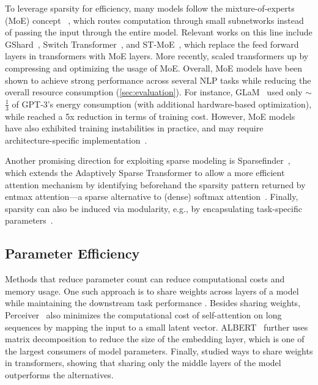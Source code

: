 To leverage sparsity for efficiency, many models follow the mixture-of-experts (MoE) concept~ \citep{jacobs1991adaptive,shazeer2017outrageously,fedus2022review}, which routes computation through small subnetworks instead of passing the input through the entire model. Relevant works on this line include GShard~\citep{Lepikhin2021GShardSG}, Switch Transformer~\citep{fedus2021switch}, and ST-MoE~\citep{zoph2022designing}, which replace the feed forward layers in transformers with MoE layers. More recently, \citet{Rajbhandari2022} scaled transformers up by compressing and optimizing the usage of MoE. Overall, MoE models have been shown to achieve strong performance across several NLP tasks while reducing the overall resource consumption (\ref{sec:evaluation}). 
For instance, GLaM~\citep{pmlr-v162-du22c} used only $\sim$$\frac{1}{3}$ of GPT-3's energy consumption (with additional hardware-based optimization), while \citet{Rajbhandari2022} reached a 5x reduction in terms of training cost. However, MoE models have also exhibited training instabilities in practice, and may require architecture-specific implementation~\citep{zoph2022designing,mustafa2022multimodal}.

Another promising direction for exploiting sparse modeling is Sparsefinder~\citep{treviso-etal-2022-predicting}, which extends the Adaptively Sparse Transformer \citep{correia_adaptively_2019} to allow a more efficient attention mechanism by identifying beforehand the sparsity pattern returned by entmax attention---a sparse alternative to (dense) softmax attention~\citep{peters-etal-2019-sparse}. Finally, sparsity can also be induced via modularity, e.g., by encapsulating task-specific parameters~\citep{ponti2022combining}.

\subsection{Parameter Efficiency} Methods that reduce parameter count can reduce computational costs and memory usage. One such approach is to share weights across layers of a model while maintaining the downstream task performance \citep{dehghani2018universal,lan2019albert}. Besides sharing weights, Perceiver~\citep{jaegle2021perceiver} also minimizes the computational cost of self-attention on long sequences by mapping the input to a small latent vector. ALBERT~\citep{lan2019albert} further uses matrix decomposition to reduce the size of the embedding layer, which is one of the largest consumers of model parameters. Finally, \citet{reid-etal-2021-subformer-exploring} studied ways to share weights in transformers, showing that sharing only the middle layers of the model outperforms the alternatives.

